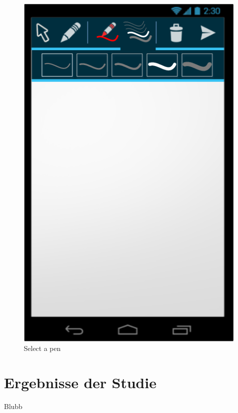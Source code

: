 \documentclass{chi-ext}
\begin{document}
\begin{figure}
  \centering
  \includegraphics[width=\linewidth]{img/android/mockup_pen.png}
  \caption{Select a pen}
  \label{fig:mockup_pen}
\end{figure}

\section{Ergebnisse der Studie}
Blubb

\end{document}
